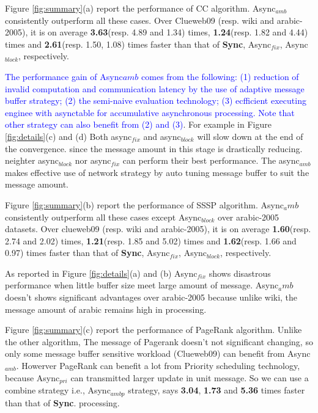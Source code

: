  Figure \ref{fig:summary}(a) report the performance of CC algorithm. Async$_{amb}$ consistently outperform all these cases. Over Clueweb09 (resp. wiki and arabic-2005), it is on average \textbf{3.63}(resp. 4.89 and 1.34) times, \textbf{1.24}(resp. 1.82 and 4.44) times and  \textbf{2.61}(resp. 1.50, 1.08) times faster than that of \textbf{Sync}, Async$_{fix}$, Async$_{block}$, respectively. 

\textcolor{blue}{
	The performance gain of Async${amb}$ comes from the following:
	(1) reduction of invalid computation and communication latency by the use of adaptive message buffer strategy; 
	(2) the semi-naive evaluation technology;
	(3) ecfficient executing enginee with asynctable for accumulative asynchronous processing.
	Note that other strategy can also benefit from (2) and (3)}.
For example in Figure \ref{fig:details}(c) and (d) Both async$_{fix}$ and  async$_{block}$ will slow down at the end of the convergence. since the message amount in this stage is drastically reducing. neighter async$_{block}$ nor async$_{fix}$ can perform their best performance. The async$_{amb}$ makes effective use of network strategy by auto tuning message buffer to suit the message amount.

 Figure \ref{fig:summary}(b) report the performance of SSSP algorithm. Async$_amb$ consistently outperform all these cases except Async$_{block}$ over arabic-2005 datasets. Over clueweb09 (resp. wiki and arabic-2005), it is on average  \textbf{1.60}(resp. 2.74 and 2.02) times, \textbf{1.21}(resp. 1.85 and 5.02) times and  \textbf{1.62}(resp. 1.66 and 0.97) times faster than that of \textbf{Sync}, Async$_{fix}$, Async$_{block}$, respectively. 

As reported in Figure \ref{fig:details}(a) and (b) Async$_{fix}$ shows disastrous performance when little buffer size meet large amount of message. Async$_amb$ doesn't shows significant advantages over arabic-2005 because unlike wiki, the message amount of arabic remains high in processing.


 Figure \ref{fig:summary}(c) report the performance of PageRank algorithm. Unlike the other algorithm, The message of Pagerank doesn't not significant changing, so only some message buffer sensitive workload (Clueweb09) can benefit from Async$_{amb}$. Howerver PageRank can benefit a lot from Priority scheduling technology, because Async$_{pri}$ can transmitted larger update in unit message. So we can use a combine strategy i.e., Async$_{ambp}$ strategy, says \textbf{3.04}, \textbf{1.73} and \textbf{5.36} times faster than that of \textbf{Sync}. processing.

